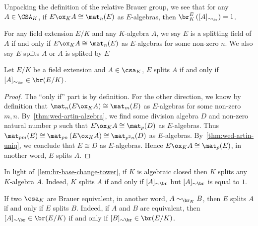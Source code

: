  \begin{remark}
   Unpacking the definition of the relative Brauer group, we see that for any $A \in \CSA_{K}$, if $E\ox_{K}A\cong\mat_{n}(E)$ as $E$-algebras, then $\br^{E}_{K}\left([A]_{\sim_{\br}}\right)=1$.
 \end{remark}

 \begin{definition}
   For any field extension $E/K$ and any $K$-algebra $A$, we say $E$ is a splitting field of $A$ if and only if $E\ox_{K}A \cong \mat_{n}(E)$ as $E$-algebras for some non-zero $n$. We also say $E$ splits $A$ or $A$ is splited by $E$
   \leanok
 \end{definition}

  \begin{theorem}
   \label{thm:split-iff-mem-relative}
   Let $E/K$ be a field extension and $A\in\csa_{K}$, $E$ splits $A$ if and only if $[A]_{\sim_{\br}}\in\br(E/K)$.
   \leanok
 \end{theorem}

 \begin{proof}
   The ``only if'' part is by definition. For the other direction, we know by definition that $\mat_{n}(E\ox_{K}A)\cong\mat_{m}(E)$ as $E$-algebras for some non-zero $m, n$. By~\cref{thm:wed-artin-algebra}, we find some division algebra $D$ and non-zero natural number $p$ such that $E\ox_{K}A\cong \mat_{p}(D)$ as $E$-algebras. Thus $\mat_{pm}(E)\cong\mat_{pn}\left(E\ox_{K}A\right)\cong\mat_{p^{2}n}(D)$ as $E$-algebras. By~\cref{thm:wed-artin-uniq}, we conclude that $E\cong D$ as $E$-algebras. Hence $E\ox_{K}A\cong \mat_{p}(E)$, in another word, $E$ splits $A$.
 \end{proof}

 \begin{remark}
   In light of~\cref{lem:br-base-change-tower}, if $K$ is algebraic closed then $K$ splits any $K$-algebra $A$. Indeed, $K$ splits $A$ if and only if $[A]_{\sim\br}$ but $[A]_{\sim\br}$ is equal to $1$.
 \end{remark}

 \begin{remark}
   If two $\csa_{K}$ are Brauer equivalent, in another word, $A \sim_{\br_{K}} B$, then $E$ splits $A$ if and only if $E$ splits $B$. Indeed, if $A$ and $B$ are equivalent, then $[A]_{\sim\br} \in \br(E/K)$ if and only if $[B]_{\sim\br}\in\br(E/K)$.
 \end{remark}



